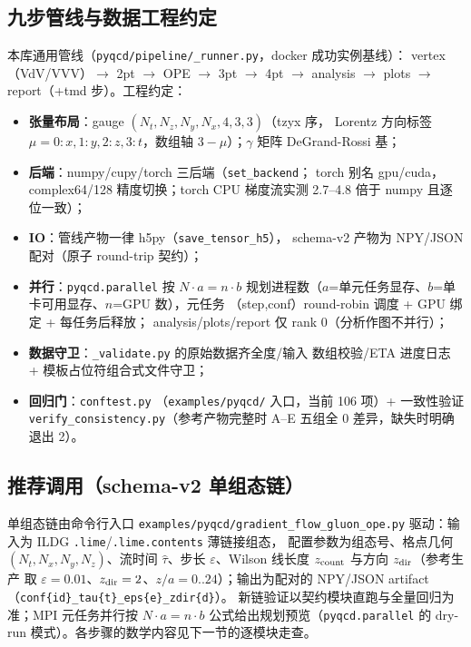 \documentclass[11pt,a4paper]{ctexart}
\newcommand{\eps}{\varepsilon}
\newcommand{\code}[1]{\texttt{#1}}
\newcommand{\zzh}{\widehat{\tau}}
\begin{document}
\subsection{九步管线与数据工程约定}

本库通用管线（\code{pyqcd/pipeline/\_runner.py}，docker 成功实例基线）：
vertex（VdV/VVV）$\to$ 2pt $\to$ OPE $\to$ 3pt $\to$ 4pt $\to$ analysis
$\to$ plots $\to$ report（+tmd 步）。工程约定：
\begin{itemize}
  \item \textbf{张量布局}：gauge $(N_t,N_z,N_y,N_x,4,3,3)$（tzyx 序，
  Lorentz 方向标签 $\mu=0\!:\!x,1\!:\!y,2\!:\!z,3\!:\!t$，数组轴
  $3-\mu$）；$\gamma$ 矩阵 DeGrand-Rossi 基；
  \item \textbf{后端}：numpy/cupy/torch 三后端（\code{set\_backend}；
  torch 别名 gpu/cuda，complex64/128 精度切换；torch CPU 梯度流实测
  2.7--4.8 倍于 numpy 且逐位一致）；
  \item \textbf{IO}：管线产物一律 h5py（\code{save\_tensor\_h5}），
  schema-v2 产物为 NPY/JSON 配对（原子 round-trip 契约）；
  \item \textbf{并行}：\code{pyqcd.parallel} 按 $N\!\cdot\!a=n\!\cdot\!b$
  规划进程数（$a$=单元任务显存、$b$=单卡可用显存、$n$=GPU 数），元任务
  （step,conf）round-robin 调度 + GPU 绑定 + 每任务后释放；
  analysis/plots/report 仅 rank 0（分析作图不并行）；
  \item \textbf{数据守卫}：\code{\_validate.py} 的原始数据齐全度/输入
  数组校验/ETA 进度日志 + 模板占位符组合式文件守卫；
  \item \textbf{回归门}：\code{conftest.py}
  （\code{examples/pyqcd/} 入口，当前 106 项）+ 一致性验证
  \code{verify\_consistency.py}（参考产物完整时 A--E 五组全
  0 差异，缺失时明确退出 2）。
\end{itemize}

\subsection{推荐调用（schema-v2 单组态链）}

单组态链由命令行入口 \code{examples/pyqcd/gradient\_flow\_gluon\_ope.py}
驱动：输入为 ILDG \code{.lime}/\code{.lime.contents} 薄链接组态，
配置参数为组态号、格点几何 $(N_t,N_x,N_y,N_z)$、流时间 $\zzh$、步长
$\eps$、Wilson 线长度 $z_{\rm count}$ 与方向 $z_{\rm dir}$（参考生产
取 $\eps=0.01$、$z_{\rm dir}=2$、$z/a=0..24$）；输出为配对的
NPY/JSON artifact（\code{conf\{id\}\_tau\{t\}\_eps\{e\}\_zdir\{d\}}）。
新链验证以契约模块直跑与全量回归为准；MPI 元任务并行按
$N\cdot a=n\cdot b$ 公式给出规划预览（\code{pyqcd.parallel} 的
dry-run 模式）。各步骤的数学内容见下一节的逐模块走查。
\end{document}
